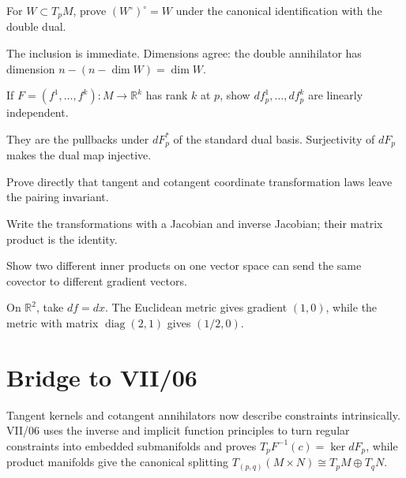 \begin{problem}\label{prob:vii05-ch02}
For \(W\subset T_pM\), prove \((W^\circ)^\circ=W\) under the canonical identification with the double dual.
\end{problem}
\begin{solution}
The inclusion is immediate. Dimensions agree: the double annihilator has dimension \(n-(n-\dim W)=\dim W\).
\end{solution}

\begin{problem}\label{prob:vii05-ch03}
If \(F=(f^1,\dots,f^k):M\to\mathbb R^k\) has rank \(k\) at \(p\), show \(df^1_p,\dots,df^k_p\) are linearly independent.
\end{problem}
\begin{solution}
They are the pullbacks under \(dF_p^*\) of the standard dual basis. Surjectivity of \(dF_p\) makes the dual map injective.
\end{solution}

\begin{problem}\label{prob:vii05-ch04}
Prove directly that tangent and cotangent coordinate transformation laws leave the pairing invariant.
\end{problem}
\begin{solution}
Write the transformations with a Jacobian and inverse Jacobian; their matrix product is the identity.
\end{solution}

\begin{problem}\label{prob:vii05-ch05}
Show two different inner products on one vector space can send the same covector to different gradient vectors.
\end{problem}
\begin{solution}
On \(\mathbb R^2\), take \(df=dx\). The Euclidean metric gives gradient \((1,0)\), while the metric with matrix \(\operatorname{diag}(2,1)\) gives \((1/2,0)\).
\end{solution}

\section*{Bridge to VII/06}
Tangent kernels and cotangent annihilators now describe constraints intrinsically. VII/06 uses the inverse and implicit function principles to turn regular constraints into embedded submanifolds and proves \(T_pF^{-1}(c)=\ker dF_p\), while product manifolds give the canonical splitting \(T_{(p,q)}(M\times N)\cong T_pM\oplus T_qN\).

